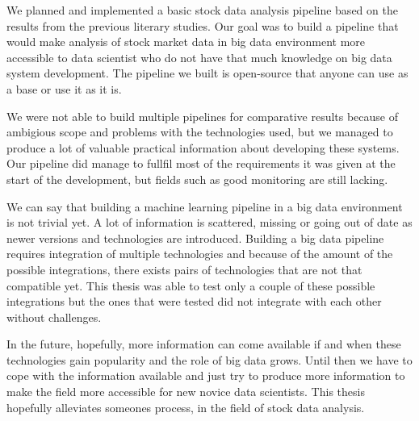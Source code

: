 We planned and implemented a basic stock data analysis pipeline based on the results from the previous literary studies.
Our goal was to build a pipeline that would make analysis of stock market data in big data environment more accessible to data scientist who do not have that much knowledge on big data system development.
The pipeline we built is open-source that anyone can use as a base or use it as it is.

We were not able to build multiple pipelines for comparative results because of ambigious scope and problems with the technologies used, but we managed to produce a lot of valuable practical information about developing these systems.
Our pipeline did manage to fullfil most of the requirements it was given at the start of the development, but fields such as good monitoring are still lacking.

We can say that building a machine learning pipeline in a big data environment is not trivial yet.
A lot of information is scattered, missing or going out of date as newer versions and technologies are introduced.
Building a big data pipeline requires integration of multiple technologies and because of the amount of the possible integrations, there  exists pairs of technologies that are not that compatible yet.
This thesis was able to test only a couple of these possible integrations but the ones that were tested did not integrate with each other without challenges.

In the future, hopefully, more information can come available if and when these technologies gain popularity and the role of big data grows.
Until then we have to cope with the information available and just try to produce more information to make the field more accessible for new novice data scientists.
This thesis hopefully alleviates someones process, in the field of stock data analysis.
